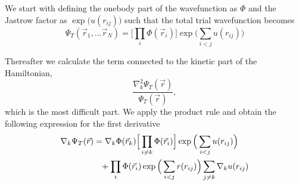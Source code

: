 \documentclass[norsk,a4paper,12pt]{article}
\begin{document}
We start with defining the onebody part of the wavefunction as $\Phi$ and the Jastrow factor as $\exp\big(u(r_{ij})\big)$ such that the total trial wavefunction becomes
\begin{equation}
\Psi_T(\vec{r}_1,\hdots\vec{r}_N)=\Big[\prod_i\Phi(\vec{r}_i)\Big]\exp\Big(\sum_{i<j}u(r_{ij})\Big)
\end{equation}

Thereafter we calculate the term connected to the kinetic part of the Hamiltonian,
\begin{equation}
\frac{\nabla_k^2\Psi_T(\vec{r})}{\Psi_T(\vec{r})},
\label{eq:ham_kin}
\end{equation}
which is the most difficult part. We apply the product rule and obtain the following expression for the first derivative
\begin{align}
\nabla_k\Psi_T(\vec{r})&=\nabla_k\Phi(\vec{r}_k)\Big[\prod_{i\neq k}\Phi(\vec{r}_i)\Big]\exp\Big(\sum_{i<j}u(r_{ij})\Big)\notag\\
&\phantom{=}+\prod_i\Phi(\vec{r}_i)\exp\Big(\sum_{i<j}r(r_{ij})\Big)
\sum_{j\neq k}\nabla_k u(r_{ij})
\end{align}
\end{document}
